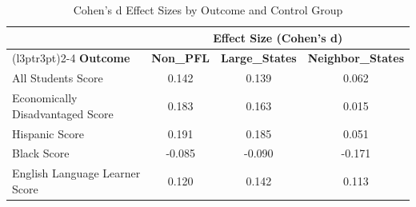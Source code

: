 \begin{table}[!h]
\centering
\caption{\label{tab:tab:cohens_d}Cohen's d Effect Sizes by Outcome and Control Group}
\centering
\begin{tabular}[t]{lccc}
\toprule
\multicolumn{1}{c}{ } & \multicolumn{3}{c}{Effect Size (Cohen's d)} \\
\cmidrule(l{3pt}r{3pt}){2-4}
\textbf{Outcome} & \textbf{Non\_PFL} & \textbf{Large\_States} & \textbf{Neighbor\_States}\\
\midrule
All Students Score & 0.142 & 0.139 & 0.062\\
Economically Disadvantaged Score & 0.183 & 0.163 & 0.015\\
Hispanic Score & 0.191 & 0.185 & 0.051\\
Black Score & -0.085 & -0.090 & -0.171\\
English Language Learner Score & 0.120 & 0.142 & 0.113\\
\bottomrule
\end{tabular}
\end{table}